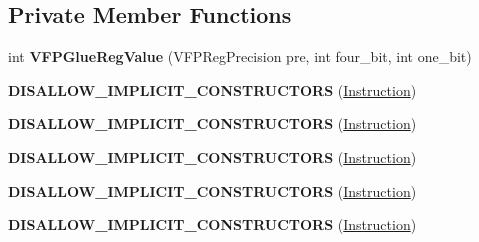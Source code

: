 \subsection*{Private Member Functions}
\begin{DoxyCompactItemize}
\item 
int {\bfseries V\+F\+P\+Glue\+Reg\+Value} (V\+F\+P\+Reg\+Precision pre, int four\+\_\+bit, int one\+\_\+bit)\hypertarget{classv8_1_1internal_1_1_instruction_ae256ceecab8c0fef1b511398a83bf6d8}{}\label{classv8_1_1internal_1_1_instruction_ae256ceecab8c0fef1b511398a83bf6d8}

\item 
{\bfseries D\+I\+S\+A\+L\+L\+O\+W\+\_\+\+I\+M\+P\+L\+I\+C\+I\+T\+\_\+\+C\+O\+N\+S\+T\+R\+U\+C\+T\+O\+RS} (\hyperlink{classv8_1_1internal_1_1_instruction}{Instruction})\hypertarget{classv8_1_1internal_1_1_instruction_ae8883b19fddda0c95ec26534b6a86374}{}\label{classv8_1_1internal_1_1_instruction_ae8883b19fddda0c95ec26534b6a86374}

\item 
{\bfseries D\+I\+S\+A\+L\+L\+O\+W\+\_\+\+I\+M\+P\+L\+I\+C\+I\+T\+\_\+\+C\+O\+N\+S\+T\+R\+U\+C\+T\+O\+RS} (\hyperlink{classv8_1_1internal_1_1_instruction}{Instruction})\hypertarget{classv8_1_1internal_1_1_instruction_ae8883b19fddda0c95ec26534b6a86374}{}\label{classv8_1_1internal_1_1_instruction_ae8883b19fddda0c95ec26534b6a86374}

\item 
{\bfseries D\+I\+S\+A\+L\+L\+O\+W\+\_\+\+I\+M\+P\+L\+I\+C\+I\+T\+\_\+\+C\+O\+N\+S\+T\+R\+U\+C\+T\+O\+RS} (\hyperlink{classv8_1_1internal_1_1_instruction}{Instruction})\hypertarget{classv8_1_1internal_1_1_instruction_ae8883b19fddda0c95ec26534b6a86374}{}\label{classv8_1_1internal_1_1_instruction_ae8883b19fddda0c95ec26534b6a86374}

\item 
{\bfseries D\+I\+S\+A\+L\+L\+O\+W\+\_\+\+I\+M\+P\+L\+I\+C\+I\+T\+\_\+\+C\+O\+N\+S\+T\+R\+U\+C\+T\+O\+RS} (\hyperlink{classv8_1_1internal_1_1_instruction}{Instruction})\hypertarget{classv8_1_1internal_1_1_instruction_ae8883b19fddda0c95ec26534b6a86374}{}\label{classv8_1_1internal_1_1_instruction_ae8883b19fddda0c95ec26534b6a86374}

\item 
{\bfseries D\+I\+S\+A\+L\+L\+O\+W\+\_\+\+I\+M\+P\+L\+I\+C\+I\+T\+\_\+\+C\+O\+N\+S\+T\+R\+U\+C\+T\+O\+RS} (\hyperlink{classv8_1_1internal_1_1_instruction}{Instruction})\hypertarget{classv8_1_1internal_1_1_instruction_ae8883b19fddda0c95ec26534b6a86374}{}\label{classv8_1_1internal_1_1_instruction_ae8883b19fddda0c95ec26534b6a86374}

\end{DoxyCompactItemize}



